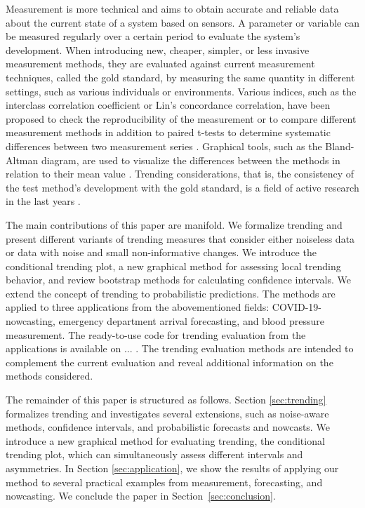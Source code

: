 Measurement is more technical and aims to obtain accurate and reliable data about the current state of a system based on sensors. 
A parameter or variable can be measured regularly over a certain period to evaluate the system's development.
When introducing new, cheaper, simpler, or less invasive measurement methods, they are evaluated against current measurement techniques, called the gold standard, by measuring the same quantity in different settings, such as various individuals or environments.
Various indices, such as the interclass correlation coefficient or Lin's concordance correlation, have been proposed to check the reproducibility of the measurement or to compare different measurement methods \citep{lawrence1989concordance,koo2016guideline} in addition to paired t-tests to determine systematic differences between two measurement series \citep{watson2010method}. 
Graphical tools, such as the Bland-Altman diagram, are used to visualize the differences between the methods in relation to their mean value \citep{bland1986statistical}. 
Trending considerations, that is, the consistency of the test method's development with the gold standard, is a field of active research in the last years \citep{Saugel2015,saugel2018error,hiraishi2021concordance}. 

The main contributions of this paper are manifold.
We formalize trending and present different variants of trending measures that consider either noiseless data or data with noise and small non-informative changes.
We introduce the conditional trending plot, a new graphical method for assessing local trending behavior, and review bootstrap methods for calculating confidence intervals.
We extend the concept of trending to probabilistic predictions.
The methods are applied to three applications from the abovementioned fields: COVID-19-nowcasting, emergency department arrival forecasting, and blood pressure measurement.
The ready-to-use code for trending evaluation from the applications is available on ... .
The trending evaluation methods are intended to complement the current evaluation and reveal additional information on the methods considered.

The remainder of this paper is structured as follows. 
Section \ref{sec:trending} formalizes trending and investigates several extensions, such as noise-aware methods, confidence intervals, and probabilistic forecasts and nowcasts. 
We introduce a new graphical method for evaluating trending, the conditional trending plot, which can simultaneously assess different intervals and asymmetries. 
In Section \ref{sec:application}, we show the results of applying our method to several practical examples from measurement, forecasting, and nowcasting. 
We conclude the paper in Section~\ref{sec:conclusion}.
